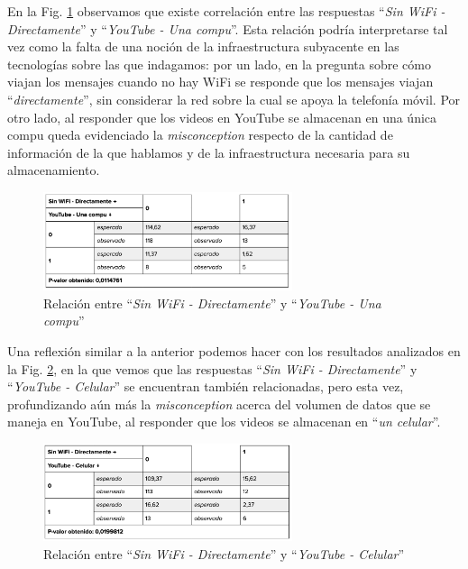 En la Fig. \ref{fig:analisis34} observamos que existe correlación entre las respuestas ``\textit{Sin WiFi - Directamente}'' y ``\textit{YouTube - Una compu}''. Esta relación podría interpretarse tal vez como la falta de una noción de la infraestructura subyacente en las tecnologías sobre las que indagamos: por un lado, en la pregunta sobre cómo viajan los mensajes cuando no hay WiFi se responde que los mensajes viajan ``\textit{directamente}'', sin considerar la red sobre la cual se apoya la telefonía móvil. Por otro lado, al responder que los videos en YouTube se almacenan en una única compu queda evidenciado la \textit{misconception} respecto de la cantidad de información de la que hablamos y de la infraestructura necesaria para su almacenamiento.

\begin{figure}[h]
    \centering
    \includegraphics[width=0.65\textwidth]{images_analisis/34.png}
    \caption{Relación entre ``\textit{Sin WiFi - Directamente}'' y ``\textit{YouTube - Una compu}''}
    \label{fig:analisis34}
\end{figure}

\newpage

Una reflexión similar a la anterior podemos hacer con los resultados analizados en la Fig. \ref{fig:analisis35}, en la que vemos que las respuestas ``\textit{Sin WiFi - Directamente}'' y ``\textit{YouTube - Celular}'' se encuentran también relacionadas, pero esta vez, profundizando aún más la \textit{misconception} acerca del volumen de datos que se maneja en YouTube, al responder que los videos se almacenan en ``\textit{un celular}''.

\begin{figure}[h]
    \centering
    \includegraphics[width=0.65\textwidth]{images_analisis/35.png}
    \caption{Relación entre ``\textit{Sin WiFi - Directamente}'' y ``\textit{YouTube - Celular}''}
    \label{fig:analisis35}
\end{figure}


